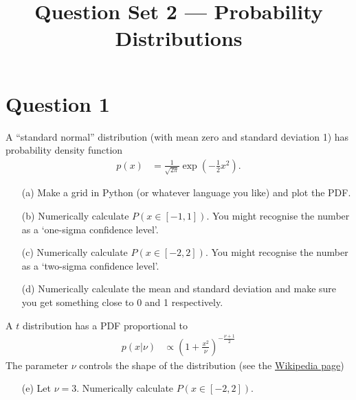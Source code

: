 \documentclass[a4paper, 12pt]{article}
\title{Question Set 2 --- Probability Distributions}
\author{}
\date{}
\begin{document}
\maketitle


\setlength{\parindent}{0pt}
\setlength{\parskip}{8pt}

\section*{Question 1}
A ``standard normal'' distribution (with mean zero and standard deviation 1)
has probability density function
\begin{align}
p(x) &= \frac{1}{\sqrt{2\pi}} \exp\left(-\frac{1}{2}x^2\right).
\end{align}

\begin{enumerate}
\item[(a)] Make a grid in Python (or whatever language you like) and plot
           the PDF.
\item[(b)] Numerically calculate $P(x \in [-1, 1])$. You might recognise the
           number as a `one-sigma confidence level'.
\item[(c)] Numerically calculate $P(x \in [-2, 2])$. You might recognise the
           number as a `two-sigma confidence level'.
\item[(d)] Numerically calculate the mean and standard deviation and make sure
           you get something close to 0 and 1 respectively.
\end{enumerate}

A $t$ distribution has a PDF proportional to
\begin{align}
p(x | \nu) &\propto \left(1 + \frac{x^2}{\nu}\right)^{-\frac{\nu + 1}{2}}
\end{align}
The parameter $\nu$ controls the shape of the distribution
(see the \href{https://en.wikipedia.org/wiki/Student\%27s_t-distribution}{Wikipedia page})

\begin{enumerate}
\item[(e)] Let $\nu=3$. Numerically calculate $P(x \in [-2, 2])$.
\end{enumerate}
\end{document}
